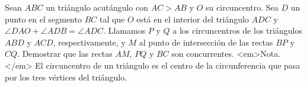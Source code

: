 Sean $ABC$ un triángulo acutángulo con $AC > AB$ y $O$ su circuncentro. Sea $D$ un punto en el segmento $BC$ tal que $O$ está en el interior del triángulo $ADC$ y $\angle DAO + \angle ADB = \angle ADC$. Llamamos $P$ y $Q$ a los circuncentros de los triángulos $ABD$ y $ACD$, respectivamente, y $M$ al punto de intersección de las rectas $BP$ y $CQ$. Demostrar que las rectas $AM$, $PQ$ y $BC$ son concurrentes.
<em>Nota.</em> El circuncentro de un triángulo es el centro de la circunferencia que pasa por los tres vértices del triángulo.
